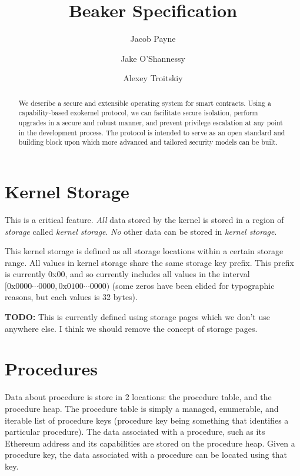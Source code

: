 \documentclass[english,a4paper]{article}
\title{Beaker Specification}\label{beaker-specification}
\author{Jacob Payne \and Jake O'Shannessy \and Alexey Troitskiy}
\begin{document}
\maketitle

\begin{abstract}\label{abstract}

We describe a secure and extensible operating system for smart contracts. Using
a capability-based exokernel protocol, we can facilitate secure isolation,
perform upgrades in a secure and robust manner, and prevent privilege escalation
at any point in the development process. The protocol is intended to serve as an
open standard and building block upon which more advanced and tailored security
models can be built.

\end{abstract}

\newpage
\tableofcontents
\newpage

\section{Kernel Storage}\label{kernel-storage}
This is a critical feature. \emph{All} data stored by the kernel is stored in a
region of \emph{storage} called \emph{kernel storage}. \emph{No} other data can
be stored in \emph{kernel storage}.

This kernel storage is defined as all storage locations within a certain storage
range. All values in kernel storage share the same storage key prefix. This
prefix is currently 0x00, and so currently includes all values in the interval
$[0\text{x}0000 \cdots 0000, 0\text{x}0100 \cdots 0000)$ (some zeros have been
elided for typographic reasons, but each values is 32 bytes).

\textbf{TODO:} This is currently defined using storage pages which we don't use anywhere
else. I think we should remove the concept of storage pages.

\section{Procedures}\label{procedures}
Data about procedure is store in 2 locations: the procedure table, and the
procedure heap. The procedure table is simply a managed, enumerable, and
iterable list of procedure keys (procedure key being something that identifies a
particular procedure). The data associated with a procedure, such as its
Ethereum address and its capabilities are stored on the procedure heap. Given a
procedure key, the data associated with a procedure can be located using that
key.
\end{document}
